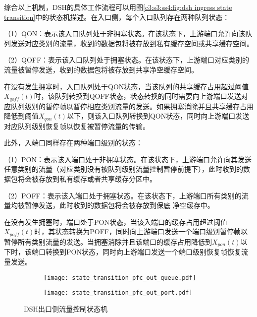 综合以上机制，DSH的具体工作流程可以用图\ref{c3:s3:ss4:fig:dsh ingress state transition}中的状态机描述。在入口侧，每个入口队列存在两种队列状态：

（1）QON：表示该入口队列处于非拥塞状态。在该状态下，上游端口允许向该队列发送对应类别的流量，收到的数据包将被存放到私有缓存空间或共享缓存空间。

（2）QOFF：表示该入口队列处于拥塞状态。在该状态下，上游端口对应类别的流量被暂停发送，收到的数据包将被存放到共享净空缓存空间。

在没有发生拥塞时，入口队列处于QON状态，当该队列的共享缓存占用超过阈值$X_{qoff}(t)$时，该队列转换到QOFF状态，状态转换的同时需要向上游端口发送对应队列级别的暂停帧以暂停相应类别流量的发送。如果拥塞消除并且共享缓存占用降低到阈值$X_{qon}(t)$以下，则该入口队列转换到QON状态，同时向上游端口发送对应队列级别恢复帧以恢复被暂停流量的传输。

此外，入端口同样存在两种端口级别的状态：

\setcounter{paragraph}{0}
（1）PON：表示该入端口处于非拥塞状态。在该状态下，上游端口允许向其发送任意类别的流量（对应类别没有被队列级别流量控制暂停前提下），此时收到的数据包将会被存放到私有缓存或者共享缓存分区中。

（2）POFF：表示该入端口处于拥塞状态。在该状态下，上游端口所有类别的流量均被暂停发送，此时收到的数据包将会被存放到保底 净空缓存中。

在没有发生拥塞时，端口处于PON状态，当该入端口的缓存占用超过阈值$X_{poff}(t)$时，其状态转换为POFF，同时向上游端口发送一个端口级别暂停帧以暂停所有类别流量的发送。当拥塞消除并且该端口的缓存占用降低到$X_{pon}(t)$以下时，该端口转换到PON状态，同时向上游端口发送一个端口级别恢复帧恢复流量发送。

\begin{figure}[H]
  \begin{subfigure}[b]{0.49\linewidth}
      \centering
      \texttt{[image: state\_transition\_pfc\_out\_queue.pdf]}
      \label{c3:s3:ss4:fig:sub1:dsh egress queue state transition}
  \end{subfigure}
  \begin{subfigure}[b]{0.49\linewidth}
      \centering
      \texttt{[image: state\_transition\_pfc\_out\_port.pdf]}
      \label{c3:s3:ss4:fig:sub2:dsh egress port state transition}
  \end{subfigure}
  \caption{DSH出口侧流量控制状态机}
  \label{c3:s3:ss4:fig:dsh egress flow control}
\end{figure}


